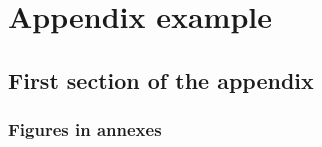 \documentclass[letterpaper%
, twoside%
, 12pt%
,these%
, english%
,creativecommons,hyperref%
]{thETS}
\begin{document}
%
%
%
%
%
%
%
%
%
%
%



%
%

\chapter{Appendix example}


\section{First section of the appendix}


\subsection{Figures in annexes}
\end{document}

